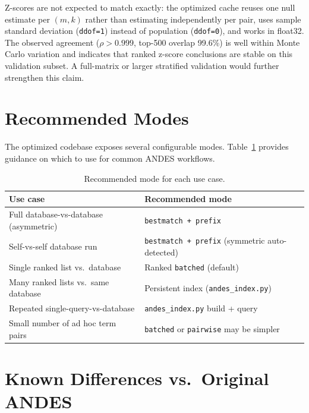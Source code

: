 \documentclass[11pt,a4paper]{article}
\begin{document}
Z-scores are not expected to match exactly: the optimized cache reuses one
null estimate per $(m,k)$ rather than estimating independently per pair, uses
sample standard deviation (\texttt{ddof=1}) instead of population
(\texttt{ddof=0}), and works in float32. The observed agreement
($\rho > 0.999$, top-500 overlap 99.6\%) is well within Monte Carlo
variation and indicates that ranked z-score conclusions are stable on this
validation subset. A full-matrix or larger stratified validation would further
strengthen this claim.

\section{Recommended Modes}

The optimized codebase exposes several configurable modes. Table~\ref{tab:modes}
provides guidance on which to use for common ANDES workflows.

\begin{table}[H]
	\centering
	\caption{Recommended mode for each use case.}
	\label{tab:modes}
	\smallskip
	\small
	\begin{tabularx}{\textwidth}{@{}Xl@{}}
		\toprule
		Use case                               & Recommended mode                                      \\
		\midrule
		Full database-vs-database (asymmetric) & \texttt{bestmatch + prefix}                           \\[2pt]
		Self-vs-self database run              & \texttt{bestmatch + prefix} (symmetric auto-detected) \\[2pt]
		Single ranked list vs.\ database       & Ranked \texttt{batched} (default)                     \\[2pt]
		Many ranked lists vs.\ same database   & Persistent index (\texttt{andes\_index.py})           \\[2pt]
		Repeated single-query-vs-database      & \texttt{andes\_index.py} build + query                \\[2pt]
		Small number of ad hoc term pairs      & \texttt{batched} or \texttt{pairwise} may be simpler  \\
		\bottomrule
	\end{tabularx}
\end{table}

\section{Known Differences vs.\ Original ANDES}
\end{document}
